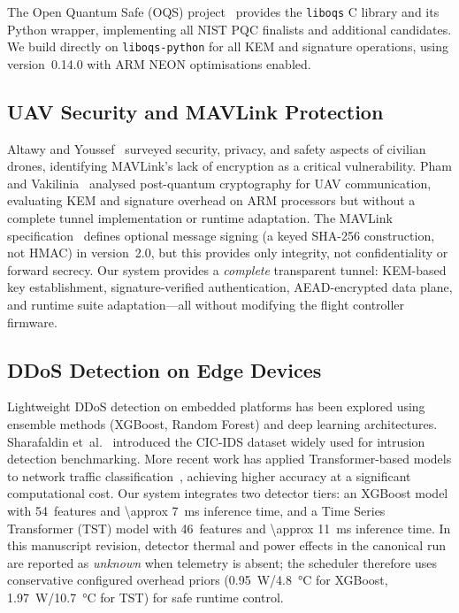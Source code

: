 \documentclass[conference]{IEEEtran}
\newcommand{\etal}{et~al.\xspace}
\begin{document}
The Open Quantum Safe (OQS) project~\cite{liboqs, oqspython} provides the \texttt{liboqs} C library and its Python wrapper, implementing all NIST PQC finalists and additional candidates.
We build directly on \texttt{liboqs-python} for all KEM and signature operations, using version~0.14.0 with ARM NEON optimisations enabled.

\subsection{UAV Security and MAVLink Protection}

Altawy and Youssef~\cite{drone-security-survey} surveyed security, privacy, and safety aspects of civilian drones, identifying MAVLink's lack of encryption as a critical vulnerability.
Pham and Vakilinia~\cite{drone-pqc-analysis} analysed post-quantum cryptography for UAV communication, evaluating KEM and signature overhead on ARM processors but without a complete tunnel implementation or runtime adaptation.
The MAVLink specification~\cite{mavlink-spec} defines optional message signing (a keyed SHA-256 construction, not HMAC) in version~2.0, but this provides only integrity, not confidentiality or forward secrecy.
Our system provides a \emph{complete} transparent tunnel: KEM-based key establishment, signature-verified authentication, AEAD-encrypted data plane, and runtime suite adaptation---all without modifying the flight controller firmware.

\subsection{DDoS Detection on Edge Devices}

Lightweight DDoS detection on embedded platforms has been explored using ensemble methods (XGBoost, Random Forest) and deep learning architectures. Sharafaldin \etal~\cite{cicids2017} introduced the CIC-IDS dataset widely used for intrusion detection benchmarking. More recent work has applied Transformer-based models to network traffic classification~\cite{tst-ids}, achieving higher accuracy at a significant computational cost.
Our system integrates two detector tiers: an XGBoost model with 54~features and \SI{\approx 7}{\milli\second} inference time, and a Time Series Transformer (TST) model with 46~features and \SI{\approx 11}{\milli\second} inference time.
In this manuscript revision, detector thermal and power effects in the canonical run are reported as \emph{unknown} when telemetry is absent; the scheduler therefore uses conservative configured overhead priors (\SI{0.95}{\watt}/\SI{4.8}{\celsius} for XGBoost, \SI{1.97}{\watt}/\SI{10.7}{\celsius} for TST) for safe runtime control.
\end{document}
